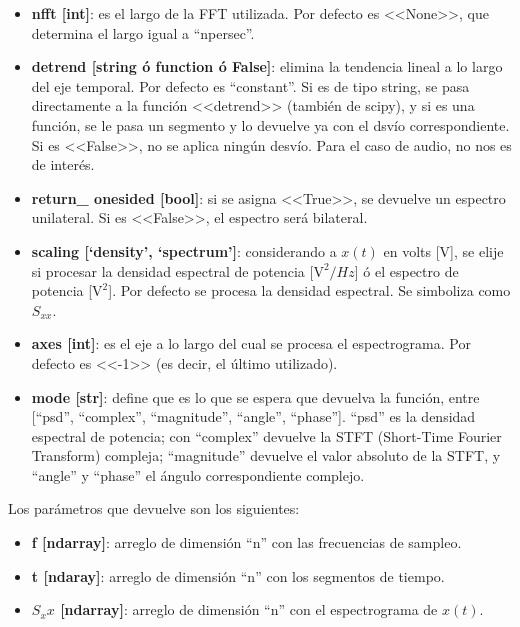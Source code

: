 \documentclass[e2_tp1_main.tex]{subfiles}
\begin{document}
\begin{itemize}
\item \textbf{nfft [int]}: es el largo de la FFT utilizada. Por defecto es <<None>>, que determina el largo igual a ``npersec''.

\item \textbf{detrend [string \'o function \'o False]}: elimina la tendencia lineal a lo largo del eje temporal. Por defecto es ``constant''. Si es de tipo string, se pasa directamente a la funci\'on <<detrend>> (tambi\'en de scipy), y si es una funci\'on, se le pasa un segmento y lo devuelve ya con el dsv\'io correspondiente. Si es <<False>>, no se aplica ning\'un desv\'io. Para el caso de audio, no nos es de inter\'es.

\item \textbf{return\_ onesided [bool]}: si se asigna <<True>>, se devuelve un espectro unilateral. Si es <<False>>, el espectro ser\'a bilateral.

\item \textbf{scaling [‘density’, ‘spectrum’]}: considerando a $x(t)$ en volts [V], se elije si procesar la densidad espectral de potencia [$\textrm{V}^2/Hz$] \'o el espectro de potencia [$\textrm{V}^2$]. Por defecto se procesa la densidad espectral. Se simboliza como $S_{xx}$.

\item \textbf{axes [int]}: es el eje a lo largo del cual se procesa el espectrograma. Por defecto es <<-1>> (es decir, el \'ultimo utilizado).

\item \textbf{mode [str]}: define que es lo que se espera que devuelva la funci\'on, entre [``psd'', ``complex'', ``magnitude'', ``angle'', ``phase'']. ``psd'' es la densidad espectral de potencia; con ``complex'' devuelve la STFT (Short-Time Fourier Transform) compleja; ``magnitude'' devuelve el valor absoluto de la STFT, y ``angle'' y ``phase'' el \'angulo correspondiente complejo.

\end{itemize}

Los par\'ametros que devuelve son los siguientes:

\begin{itemize}

\item \textbf{f [ndarray]}: arreglo de dimensi\'on ``n'' con las frecuencias de sampleo.

\item \textbf{t [ndaray]}: arreglo de dimensi\'on ``n'' con los segmentos de tiempo.

\item \textbf{$S_xx$ [ndarray]}: arreglo de dimensi\'on ``n'' con el espectrograma de $x(t)$.

\end{itemize}
\end{document}
